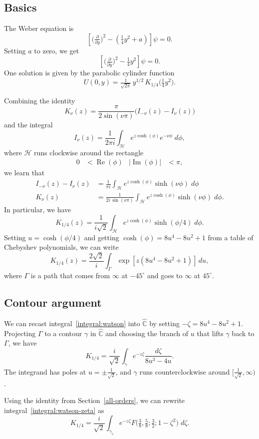 \documentclass{article}
\newcommand{\C}{\mathbb{C}}
\begin{document}
\subsection{Basics}
The Weber equation is
\[ \left[\big(\tfrac{\partial}{\partial y}\big)^2 - \left(\tfrac{1}{4}y^2 + a\right)\right] \psi = 0. \]
Setting $a$ to zero, we get
\begin{equation}\label{eqn:weber}
\left[\big(\tfrac{\partial}{\partial y}\big)^2 - \tfrac{1}{4}y^2\right] \psi = 0.
\end{equation}
One solution is given by the parabolic cylinder function~\cite[equation~12.7.10]{dlmf}
\[ U(0, y) = \tfrac{1}{\sqrt{2\pi}}\,y^{1/2}\,K_{1/4}\big(\tfrac{1}{4} y^2\big). \]

Combining the identity \cite[equation~10.27.4]{dlmf}
\[ K_\nu(z) = \frac{\pi}{2 \sin(\nu \pi)}\big(I_{-\nu}(z) - I_\nu(z)\big) \]
and the integral \cite[equation~10.32.12]{dlmf}
\[ I_\nu(z) = \frac{1}{2\pi i} \int_{\mathcal{H}} e^{z \cosh(\phi)} e^{-\nu \phi}\;d\phi, \]
where $\mathcal{H}$ runs clockwise around the rectangle
\begin{align*}
0 & < \operatorname{Re}(\phi) & |\operatorname{Im}(\phi)| & < \pi,
\end{align*}
we learn that
\begin{align*}
I_{-\nu}(z) - I_\nu(z) & = \frac{1}{\pi i} \int_{\mathcal{H}} e^{z \cosh(\phi)} \sinh(\nu \phi)\;d\phi \\
K_\nu(z) & = \frac{1}{2i\,\sin(\nu \pi)} \int_{\mathcal{H}} e^{z \cosh(\phi)} \sinh(\nu \phi)\;d\phi.
\end{align*}
In particular, we have
\[ K_{1/4}(z) = \frac{1}{i\sqrt{2}} \int_{\mathcal{H}} e^{z \cosh(\phi)} \sinh(\phi/4)\;d\phi. \]
Setting $u = \cosh(\phi/4)$ and getting $\cosh(\phi) = 8u^4 - 8u^2 + 1$ from a table of Chebyshev polynomials, we can write
\begin{equation}\label{integral:watson}
K_{1/4}(z) = \frac{2\sqrt{2}}{i} \int_\Gamma \exp\left[z \left(8u^4 - 8u^2 + 1\right)\right]\,du,
\end{equation}
where $\Gamma$ is a path that comes from $\infty$ at $-45^\circ$ and goes to $\infty$ at $45^\circ$.
\subsection{Contour argument}\label{contour-argument}
We can recast integral~\ref{integral:watson} into $\hat{\C}$ by setting $-\zeta = 8u^4 - 8u^2 + 1$. Projecting $\Gamma$ to a contour $\gamma$ in $\hat{\C}$ and choosing the branch of $u$ that lifts $\gamma$ back to $\Gamma$, we have
\begin{equation}\label{integral:watson-zeta}
K_{1/4} = \frac{i}{\sqrt{2}} \int_\gamma e^{-z\zeta}\frac{d\zeta}{8u^3 - 4u}.
\end{equation}
The integrand has poles at $u = \pm\tfrac{1}{\sqrt{2}}$, and $\gamma$ runs counterclockwise around $\big[\tfrac{1}{\sqrt{2}}, \infty\big)$.

Using the identity from Section~\ref{all-orders}, we can rewrite integral~\ref{integral:watson-zeta} as
\[ K_{1/4} = \frac{i}{\sqrt{2}} \int_{\gamma_z} e^{-z\zeta} F\big(\tfrac{3}{8}, \tfrac{5}{8}; \tfrac{3}{2}; 1 - \zeta^2\big)\;d\zeta. \]


\end{document}
